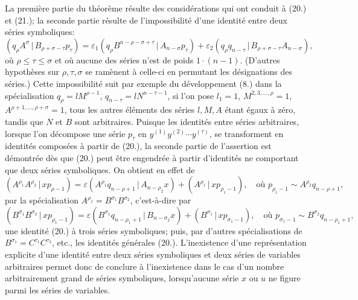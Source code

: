\documentclass[11pt]{article}
\newcommand{\pair}[2]{(#1\,|\,#2)}
\newcommand{\eps}{\varepsilon}
\begin{document}
La première partie du théorème résulte des considérations qui ont conduit à (20.) et (21.); la seconde partie résulte de l'impossibilité d'une identité entre deux séries symboliques:
\[
\pair{q_\rho A^\sigma}{B_{\rho+\sigma-\tau}p_\tau}
=\eps_1\pair{q_\rho B^{n-\rho-\sigma+\tau}}{A_{n-\sigma}p_\tau}
+\eps_2\pair{q_\rho q_{n-\tau}}{B_{\rho+\sigma-\tau}A_{n-\sigma}},
\]
où $\rho\le\tau\le\sigma$ et où aucune des séries n'est de poids $1\cdot(n-1)$. (D'autres hypothèses sur $\rho,\tau,\sigma$ se ramènent à celle-ci en permutant les désignations des séries.) Cette impossibilité suit par exemple du développement (8.) dans la spécialisation $q_\rho=lM^{\rho-1}$, $q_{n-\tau}=lN^{n-\tau-1}$, si l'on pose $l_1=1$, $M^{2,3,\ldots,\rho}=1$, $A^{\rho+1,\ldots,\rho+\sigma}=1$, tous les autres éléments des séries $l,M,A$ étant égaux à zéro, tandis que $N$ et $B$ sont arbitraires. Puisque les identités entre séries arbitraires, lorsque l'on décompose une série $p_\tau$ en $y^{(1)}y^{(2)}\cdots y^{(\tau)}$, se transforment en identités composées à partir de (20.), la seconde partie de l'assertion est démontrée dès que (20.) peut être engendrée à partir d'identités ne comportant que deux séries symboliques. On obtient en effet de
\begin{equation}
\pair{A^{\rho_1}A^{\rho_2}}{xp_{\rho-1}}
=\eps\pair{A^{\rho_1}q_{n-\rho+1}}{A_{n-\rho_2}x}
+\pair{A^{\rho_1}}{xp_{\rho_1-1}},
\quad \text{où }p_{\rho_1-1}\sim A^{\rho_2}q_{n-\rho+1},
\tag{20a}
\end{equation}
par la spécialisation $A^{\rho_1}=B^{\sigma_1}B^{\sigma_2}$, c'est-à-dire par
\[
\pair{B^{\sigma_1}B^{\sigma_2}}{xp_{\rho_1-1}}
=\eps\pair{B^{\sigma_1}q_{n-\rho_1+1}}{B_{n-\sigma_2}x}
+\pair{B^{\sigma_1}}{xp_{\sigma_1-1}},
\quad \text{où } p_{\sigma_1-1}\sim B^{\sigma_2}q_{n-\rho_1+1},
\]
une identité (20.) à trois séries symboliques; puis, par d'autres spécialisations de $B^{\sigma_1}=C^{\tau_1}C^{\tau_2}$, etc., les identités générales (20.). L'inexistence d'une représentation explicite d'une identité entre deux séries symboliques et deux séries de variables arbitraires permet donc de conclure à l'inexistence dans le cas d'un nombre arbitrairement grand de séries symboliques, lorsqu'aucune série $x$ ou $u$ ne figure parmi les séries de variables.
\end{document}
